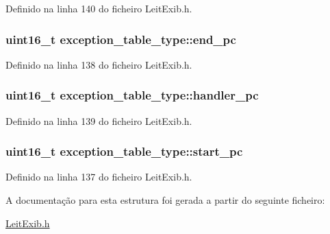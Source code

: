 Definido na linha 140 do ficheiro Leit\-Exib.\-h.

\hypertarget{structexception__table__type_affc7a7c52ef9dd25b70496e374dde498}{
\subsubsection[{end\-\_\-pc}]{\setlength{\rightskip}{0pt plus 5cm}uint16\-\_\-t exception\-\_\-table\-\_\-type\-::end\-\_\-pc}}\label{structexception__table__type_affc7a7c52ef9dd25b70496e374dde498}


Definido na linha 138 do ficheiro Leit\-Exib.\-h.

\hypertarget{structexception__table__type_a168dd215f7eea25beaf31316f15b48b7}{
\subsubsection[{handler\-\_\-pc}]{\setlength{\rightskip}{0pt plus 5cm}uint16\-\_\-t exception\-\_\-table\-\_\-type\-::handler\-\_\-pc}}\label{structexception__table__type_a168dd215f7eea25beaf31316f15b48b7}


Definido na linha 139 do ficheiro Leit\-Exib.\-h.

\hypertarget{structexception__table__type_a6d9707a45444960af306cacffc22d95c}{
\subsubsection[{start\-\_\-pc}]{\setlength{\rightskip}{0pt plus 5cm}uint16\-\_\-t exception\-\_\-table\-\_\-type\-::start\-\_\-pc}}\label{structexception__table__type_a6d9707a45444960af306cacffc22d95c}


Definido na linha 137 do ficheiro Leit\-Exib.\-h.



A documentação para esta estrutura foi gerada a partir do seguinte ficheiro\-:\begin{DoxyCompactItemize}
\item 
\hyperlink{_leit_exib_8h}{Leit\-Exib.\-h}\end{DoxyCompactItemize}
